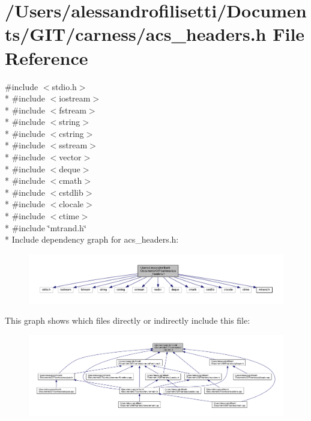 \hypertarget{a00072}{\section{/\-Users/alessandrofilisetti/\-Documents/\-G\-I\-T/carness/acs\-\_\-headers.h File Reference}
\label{a00072}
}
{\ttfamily \#include $<$stdio.\-h$>$}\\*
{\ttfamily \#include $<$iostream$>$}\\*
{\ttfamily \#include $<$fstream$>$}\\*
{\ttfamily \#include $<$string$>$}\\*
{\ttfamily \#include $<$cstring$>$}\\*
{\ttfamily \#include $<$sstream$>$}\\*
{\ttfamily \#include $<$vector$>$}\\*
{\ttfamily \#include $<$deque$>$}\\*
{\ttfamily \#include $<$cmath$>$}\\*
{\ttfamily \#include $<$cstdlib$>$}\\*
{\ttfamily \#include $<$clocale$>$}\\*
{\ttfamily \#include $<$ctime$>$}\\*
{\ttfamily \#include \char`\"{}mtrand.\-h\char`\"{}}\\*
Include dependency graph for acs\-\_\-headers.\-h\-:\nopagebreak
\begin{figure}[H]
\begin{center}
\leavevmode
\includegraphics[width=350pt]{a00124}
\end{center}
\end{figure}
This graph shows which files directly or indirectly include this file\-:\nopagebreak
\begin{figure}[H]
\begin{center}
\leavevmode
\includegraphics[width=350pt]{a00125}
\end{center}
\end{figure}
